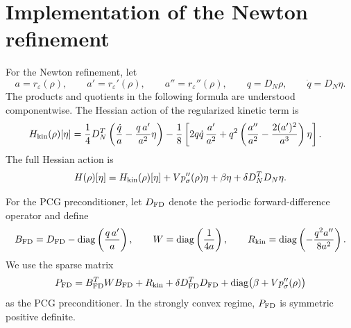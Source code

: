 \documentclass[11pt]{article}
\newcommand{\eps}{\varepsilon}
\newcommand{\sig}{\sigma}
\newcommand{\norm}[1]{\left\|#1\right\|}
\theoremstyle{plain}
\theoremstyle{definition}
\numberwithin{equation}{section}
\begin{document}
%
%

\section{Implementation of the Newton refinement}
\label{app:newton-implementation}

For the Newton refinement, let
\[
a=r_\eps(\rho),\qquad
a'=r_\eps'(\rho),\qquad
a''=r_\eps''(\rho),\qquad
q=D_N\rho,\qquad
\dot q=D_N\eta.
\]
The products and quotients in the following formula are understood
componentwise. The Hessian action of the regularized kinetic term is
\begin{align}
\label{eq:hessian-action}
H_{\rm kin}(\rho)[\eta]
={}&
\frac14D_N^T
\left(
\frac{\dot q}{a}
-
\frac{q\,a'}{a^2}\eta
\right)
-
\frac18
\left[
2q\dot q\,\frac{a'}{a^2}
+
q^2
\left(
\frac{a''}{a^2}
-
\frac{2(a')^2}{a^3}
\right)\eta
\right].
\end{align}
The full Hessian action is
\begin{equation}
\label{eq:full-hessian-action}
H(\rho)[\eta]
=
H_{\rm kin}(\rho)[\eta]
+
Vp_\sig''(\rho)\eta
+
\beta\eta
+
\delta D_N^TD_N\eta.
\end{equation}

For the PCG preconditioner, let $D_{\rm FD}$ denote the periodic
forward-difference operator and define
\[
B_{\rm FD}
=
D_{\rm FD}
-
\operatorname{diag}\left(\frac{q\,a'}{a}\right),
\qquad
W
=
\operatorname{diag}\left(\frac{1}{4a}\right),
\qquad
R_{\rm kin}
=
\operatorname{diag}\left(
-\frac{q^2a''}{8a^2}
\right).
\]
We use the sparse matrix
\begin{equation}
\label{eq:fd-preconditioner}
P_{\rm FD}
=
B_{\rm FD}^TWB_{\rm FD}
+
R_{\rm kin}
+
\delta D_{\rm FD}^TD_{\rm FD}
+
\operatorname{diag}\bigl(\beta+Vp_\sig''(\rho)\bigr)
\end{equation}
as the PCG preconditioner. In the strongly convex regime,
$P_{\rm FD}$ is symmetric positive definite.
\end{document}
